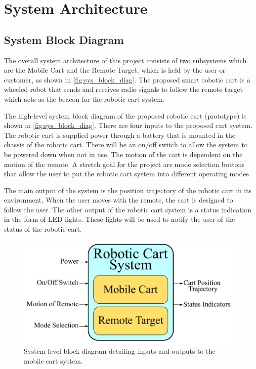 \chapter{System Architecture}
\label{ch: Chapter2}

\section{System Block Diagram}
The overall system architecture of this project consists of two subsystems which are the Mobile Cart and the Remote Target, which is held by the user or customer, as shown in \autoref{fig:sys_block_diag}. The proposed smart robotic cart is a wheeled robot that sends and receives radio signals to follow the remote target which acts as the beacon for the robotic cart system.

\vspace*{12pt}
\noindent

The high-level system block diagram of the proposed robotic cart (prototype) is shown in \autoref{fig:sys_block_diag}. There are four inputs to the proposed cart system. The robotic cart is supplied power through a battery that is mounted in the chassis of the robotic cart. There will be an on/off switch to allow the system to be powered down when not in use. The motion of the cart is dependent on the motion of the remote. A stretch goal for the project are mode selection buttons that allow the user to put the robotic cart system into different operating modes.

\vspace*{12pt}
\noindent

The main output of the system is the position trajectory of the robotic cart in its environment. When the user moves with the remote, the cart is designed to follow the user. The other output of the robotic cart system is a status indication in the form of LED lights. These lights will be used to notify the user of the status of the robotic cart.

\begin{figure}[!h]
    \centering
    \includegraphics[scale=0.9]{figs/system_block_diagram_2}
    \caption{System level block diagram detailing inputs and outputs to the
      mobile cart system.}
	\label{fig:sys_block_diag}
\end{figure}


